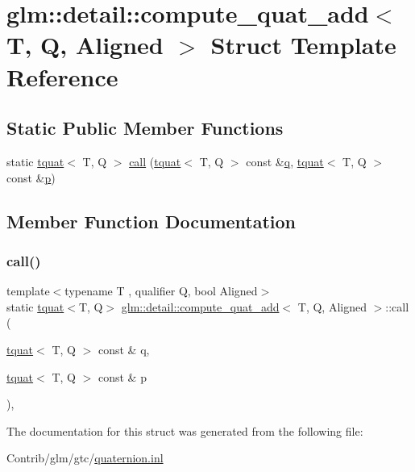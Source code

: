 \hypertarget{structglm_1_1detail_1_1compute__quat__add}{}\section{glm\+:\+:detail\+:\+:compute\+\_\+quat\+\_\+add$<$ T, Q, Aligned $>$ Struct Template Reference}
\label{structglm_1_1detail_1_1compute__quat__add}
\subsection*{Static Public Member Functions}
\begin{DoxyCompactItemize}
\item 
static \mbox{\hyperlink{structglm_1_1tquat}{tquat}}$<$ T, Q $>$ \mbox{\hyperlink{structglm_1_1detail_1_1compute__quat__add_a4e1737f5ba100ef22f3a9ce9b5c9ea39}{call}} (\mbox{\hyperlink{structglm_1_1tquat}{tquat}}$<$ T, Q $>$ const \&\mbox{\hyperlink{_s_d_l__opengl_8h_a8fc1e7b9baaae687804c7eed46ca09c6}{q}}, \mbox{\hyperlink{structglm_1_1tquat}{tquat}}$<$ T, Q $>$ const \&\mbox{\hyperlink{_s_d_l__opengl__glext_8h_aa5367c14d90f462230c2611b81b41d23}{p}})
\end{DoxyCompactItemize}


\subsection{Member Function Documentation}
\mbox{\label{structglm_1_1detail_1_1compute__quat__add_a4e1737f5ba100ef22f3a9ce9b5c9ea39}} 
\subsubsection{\texorpdfstring{call()}{call()}}
{\footnotesize\ttfamily template$<$typename T , qualifier Q, bool Aligned$>$ \\
static \mbox{\hyperlink{structglm_1_1tquat}{tquat}}$<$T, Q$>$ \mbox{\hyperlink{structglm_1_1detail_1_1compute__quat__add}{glm\+::detail\+::compute\+\_\+quat\+\_\+add}}$<$ T, Q, Aligned $>$\+::call (\begin{DoxyParamCaption}\item[{\mbox{\hyperlink{structglm_1_1tquat}{tquat}}$<$ T, Q $>$ const \&}]{q,  }\item[{\mbox{\hyperlink{structglm_1_1tquat}{tquat}}$<$ T, Q $>$ const \&}]{p }\end{DoxyParamCaption})\hspace{0.3cm}{\ttfamily [inline]}, {\ttfamily [static]}}



The documentation for this struct was generated from the following file\+:\begin{DoxyCompactItemize}
\item 
Contrib/glm/gtc/\mbox{\hyperlink{gtc_2quaternion_8inl}{quaternion.\+inl}}\end{DoxyCompactItemize}
